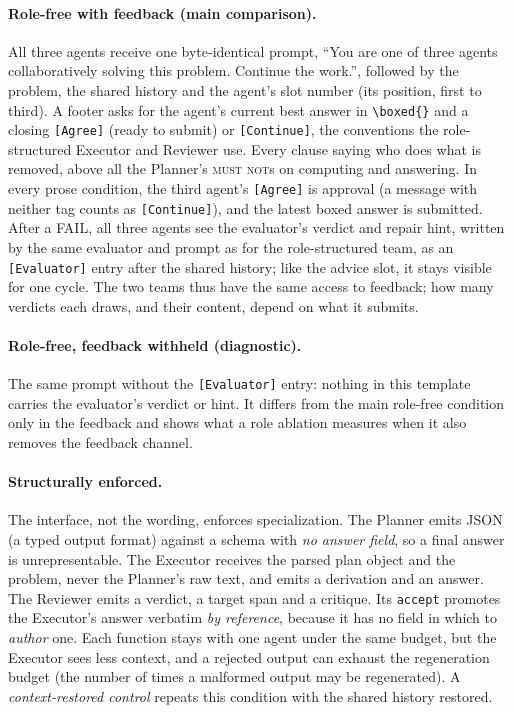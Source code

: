 \paragraph{Role-free with feedback (main comparison).} All three agents
receive one byte-identical prompt, ``You are one of three agents
collaboratively solving this problem. Continue the work.'', followed by the
problem, the shared history and the agent's slot number (its position, first
to third). A footer asks for the agent's current best answer in
\texttt{\textbackslash boxed\{\}} and a closing \texttt{[Agree]} (ready to
submit) or \texttt{[Continue]}, the conventions the role-structured Executor
and Reviewer use. Every clause saying who does what is removed, above all
the Planner's \textsc{must not}s on computing and answering. In every prose
condition, the third agent's \texttt{[Agree]} is approval (a message with
neither tag counts as \texttt{[Continue]}), and the latest boxed answer is
submitted. After a FAIL, all three agents see the evaluator's verdict and
repair hint, written by the same evaluator and prompt as for the
role-structured team, as an \texttt{[Evaluator]} entry after the shared
history; like the advice slot, it stays visible for one cycle. The two
teams thus have the same access to feedback; how many verdicts each draws,
and their content, depend on what it submits.

\paragraph{Role-free, feedback withheld (diagnostic).} The same prompt
without the \texttt{[Evaluator]} entry: nothing in this template carries
the evaluator's verdict or hint. It differs from the main role-free
condition only in the feedback and shows what a role ablation measures when
it also removes the feedback channel.

\paragraph{Structurally enforced.} The interface, not the wording, enforces
specialization. The Planner emits JSON (a typed output format) against a
schema with \emph{no answer field}, so a final answer is unrepresentable.
The Executor receives the parsed plan object and the problem, never the
Planner's raw text, and emits a derivation and an answer. The Reviewer emits
a verdict, a target span and a critique. Its \texttt{accept} promotes the
Executor's answer verbatim \emph{by reference}, because it has no field in
which to \emph{author} one. Each function stays with one agent under the
same budget, but the Executor sees less context, and a rejected output can
exhaust the regeneration budget (the number of times a malformed output may
be regenerated). A \emph{context-restored control} repeats this condition
with the shared history restored.

